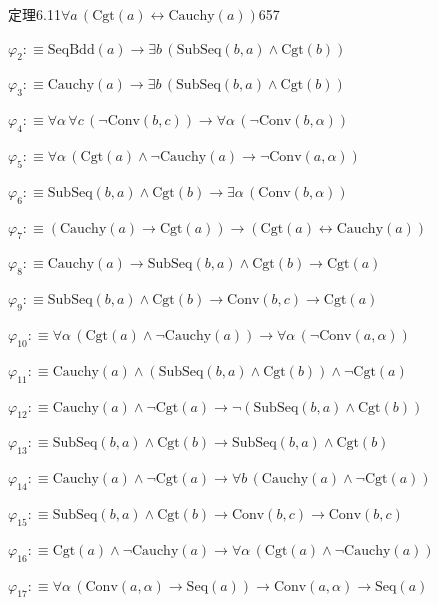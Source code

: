 \begin{fullproof}{定理6.11}{$\forall a\,(\mathrm{Cgt}(a) \leftrightarrow \mathrm{Cauchy}(a))$}{657}
\begin{abbrevlist}
\item $\varphi_{2} :\equiv \mathrm{SeqBdd}(a) \to \exists b\,(\mathrm{SubSeq}(b,a) \land \mathrm{Cgt}(b))$
\item $\varphi_{3} :\equiv \mathrm{Cauchy}(a) \to \exists b\,(\mathrm{SubSeq}(b,a) \land \mathrm{Cgt}(b))$
\item $\varphi_{4} :\equiv \forall \alpha\,\forall c\,(\neg \mathrm{Conv}(b,c)) \to \forall \alpha\,(\neg \mathrm{Conv}(b,\alpha))$
\item $\varphi_{5} :\equiv \forall \alpha\,(\mathrm{Cgt}(a) \land \neg \mathrm{Cauchy}(a) \to \neg \mathrm{Conv}(a,\alpha))$
\item $\varphi_{6} :\equiv \mathrm{SubSeq}(b,a) \land \mathrm{Cgt}(b) \to \exists \alpha\,(\mathrm{Conv}(b,\alpha))$
\item $\varphi_{7} :\equiv (\mathrm{Cauchy}(a) \to \mathrm{Cgt}(a)) \to (\mathrm{Cgt}(a) \leftrightarrow \mathrm{Cauchy}(a))$
\item $\varphi_{8} :\equiv \mathrm{Cauchy}(a) \to \mathrm{SubSeq}(b,a) \land \mathrm{Cgt}(b) \to \mathrm{Cgt}(a)$
\item $\varphi_{9} :\equiv \mathrm{SubSeq}(b,a) \land \mathrm{Cgt}(b) \to \mathrm{Conv}(b,c) \to \mathrm{Cgt}(a)$
\item $\varphi_{10} :\equiv \forall \alpha\,(\mathrm{Cgt}(a) \land \neg \mathrm{Cauchy}(a)) \to \forall \alpha\,(\neg \mathrm{Conv}(a,\alpha))$
\item $\varphi_{11} :\equiv \mathrm{Cauchy}(a) \land (\mathrm{SubSeq}(b,a) \land \mathrm{Cgt}(b)) \land \neg \mathrm{Cgt}(a)$
\item $\varphi_{12} :\equiv \mathrm{Cauchy}(a) \land \neg \mathrm{Cgt}(a) \to \neg (\mathrm{SubSeq}(b,a) \land \mathrm{Cgt}(b))$
\item $\varphi_{13} :\equiv \mathrm{SubSeq}(b,a) \land \mathrm{Cgt}(b) \to \mathrm{SubSeq}(b,a) \land \mathrm{Cgt}(b)$
\item $\varphi_{14} :\equiv \mathrm{Cauchy}(a) \land \neg \mathrm{Cgt}(a) \to \forall b\,(\mathrm{Cauchy}(a) \land \neg \mathrm{Cgt}(a))$
\item $\varphi_{15} :\equiv \mathrm{SubSeq}(b,a) \land \mathrm{Cgt}(b) \to \mathrm{Conv}(b,c) \to \mathrm{Conv}(b,c)$
\item $\varphi_{16} :\equiv \mathrm{Cgt}(a) \land \neg \mathrm{Cauchy}(a) \to \forall \alpha\,(\mathrm{Cgt}(a) \land \neg \mathrm{Cauchy}(a))$
\item $\varphi_{17} :\equiv \forall \alpha\,(\mathrm{Conv}(a,\alpha) \to \mathrm{Seq}(a)) \to \mathrm{Conv}(a,\alpha) \to \mathrm{Seq}(a)$

\end{abbrevlist}
\end{fullproof}
